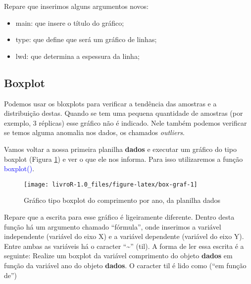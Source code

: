 \documentclass[14pt,titlepage, oneside, openany, a4paper]{book}
\newenvironment{Shaded}{\begin{snugshade}}{\end{snugshade}}
\newcommand{\DataTypeTok}[1]{\textcolor[rgb]{0.13,0.29,0.53}{#1}}
\newcommand{\KeywordTok}[1]{\textcolor[rgb]{0.13,0.29,0.53}{\textbf{#1}}}
\newcommand{\NormalTok}[1]{#1}
\newcommand{\OperatorTok}[1]{\textcolor[rgb]{0.81,0.36,0.00}{\textbf{#1}}}
\newcommand{\StringTok}[1]{\textcolor[rgb]{0.31,0.60,0.02}{#1}}
\providecommand{\tightlist}{%
  \setlength{\itemsep}{0pt}\setlength{\parskip}{0pt}}
\begin{document}
Repare que inserimos alguns argumentos novos:

\begin{itemize}
\tightlist
\item
  main: que insere o título do gráfico;
\item
  type: que define que será um gráfico de linhas;
\item
  lwd: que determina a espessura da linha;
\end{itemize}

\hypertarget{boxplot}{%
\subsection{Boxplot}\label{boxplot}}

Podemos usar os bloxplots para verificar a tendência das amostras e a distribuição destas. Quando se tem uma pequena quantidade de amostras (por exemplo, 3 réplicas) esse gráfico não é indicado. Nele também podemos verificar se temos alguma anomalia nos dados, os chamados \emph{outliers}.

Vamos voltar a nossa primeira planilha \textbf{dados} e executar um gráfico do tipo boxplot (Figura \ref{fig:box-graf}) e ver o que ele nos informa. Para isso utilizaremos a função \textcolor{blue}{boxplot()}.

\begin{Shaded}
\end{Shaded}

\begin{figure}[H]

{\centering \texttt{[image: livroR-1.0\_files/figure-latex/box-graf-1]} 

}

\caption{Gráfico tipo boxplot do comprimento por ano, da planilha dados}\label{fig:box-graf}
\end{figure}

Repare que a escrita para esse gráfico é ligeiramente diferente. Dentro desta função há um argumento chamado ``fórmula'', onde inserimos a variável independente (variável do eixo X) e a variável dependente (variável do eixo Y). Entre ambas as variáveis há o caracter ``\textasciitilde{}'' (til). A forma de ler essa escrita é a seguinte: Realize um boxplot da variável comprimento do objeto \textbf{dados} em função da variável ano do objeto \textbf{dados}. O caracter til é lido como (``em função de'')
\end{document}
